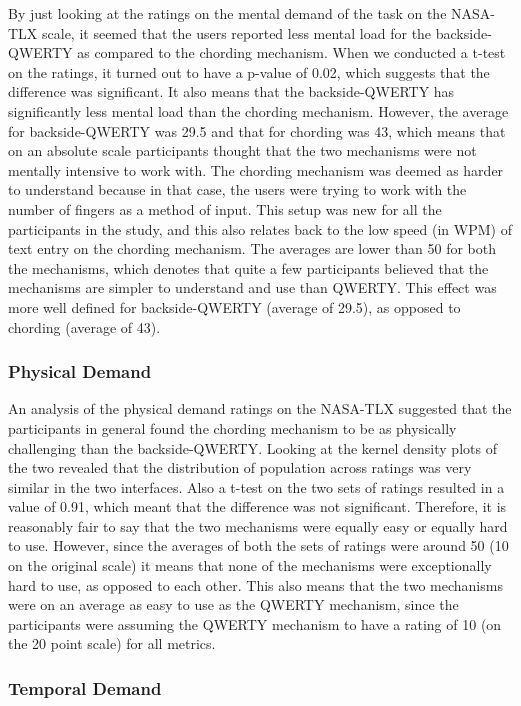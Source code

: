By just looking at the ratings on the mental demand of the task on the
NASA-TLX scale, it seemed that the users reported less mental load for
the backside-QWERTY as compared to the chording mechanism. When we
conducted a t-test on the ratings, it turned out to have a p-value of
0.02, which suggests that the difference was significant. It also
means that the backside-QWERTY has significantly less mental load than
the chording mechanism. However, the average for backside-QWERTY was
29.5 and that for chording was 43, which means that on an absolute
scale participants thought that the two mechanisms were not mentally
intensive to work with. The chording mechanism was deemed as harder to
understand because in that case, the users were trying to work with
the number of fingers as a method of input. This setup was new for all
the participants in the study, and this also relates back to the low
speed (in WPM) of text entry on the chording mechanism. The averages
are lower than 50 for both the mechanisms, which denotes that quite a
few participants believed that the mechanisms are simpler to
understand and use than QWERTY. This effect was more well defined for
backside-QWERTY (average of 29.5), as opposed to chording (average of
43).

\subsubsection{Physical Demand}

An analysis of the physical demand ratings on the NASA-TLX suggested
that the participants in general found the chording mechanism to be as
physically challenging than the backside-QWERTY. Looking at the kernel
density plots of the two revealed that the distribution of population
across ratings was very similar in the two interfaces. Also a t-test
on the two sets of ratings resulted in a value of 0.91, which meant
that the difference was not significant. Therefore, it is reasonably
fair to say that the two mechanisms were equally easy or equally hard
to use. However, since the averages of both the sets of ratings were
around 50 (10 on the original scale) it means that none of the
mechanisms were exceptionally hard to use, as opposed to each
other. This also means that the two mechanisms were on an average as
easy to use as the QWERTY mechanism, since the participants were
assuming the QWERTY mechanism to have a rating of 10 (on the 20 point
scale) for all metrics.

\subsubsection{Temporal Demand}

